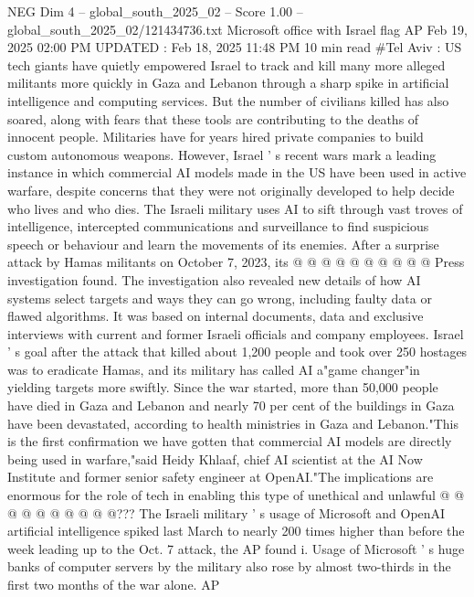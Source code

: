 \begin{textsample}{NEG Dim 4 – global\_south\_2025\_02 – Score 1.00 – global\_south\_2025\_02/121434736.txt}  \label{ex:f4_neg_434}
Microsoft office with Israel flag AP Feb 19, 2025 02:00 PM UPDATED : Feb 18, 2025 11:48 PM 10 min read \#Tel Aviv : US tech giants have quietly empowered Israel to track and kill many more alleged militants more quickly in Gaza and Lebanon through a sharp spike in artificial intelligence and computing services.
But the number of civilians killed has also soared, along with fears that these tools are contributing to the deaths of innocent people.
Militaries have for years hired private companies to build custom autonomous weapons.
However, Israel ' s recent wars mark a leading instance in which commercial AI models made in the US have been used in active warfare, despite concerns that they were not originally developed to help decide who lives and who dies.
The Israeli military uses AI to sift through vast troves of intelligence, intercepted communications and surveillance to find suspicious speech or behaviour and learn the movements of its enemies.
After a surprise attack by Hamas militants on October 7, 2023, its @ @ @ @ @ @ @ @ @ @ Press investigation found.
The investigation also revealed new details of how AI systems select targets and ways they can go wrong, including faulty data or flawed algorithms.
It was based on internal documents, data and exclusive interviews with current and former Israeli officials and company employees.
Israel ' s goal after the attack that killed about 1,200 people and took over 250 hostages was to eradicate Hamas, and its military has called AI a"game changer"in yielding targets more swiftly.
Since the war started, more than 50,000 people have died in Gaza and Lebanon and nearly 70 per cent of the buildings in Gaza have been devastated, according to health ministries in Gaza and Lebanon."This is the first confirmation we have gotten that commercial AI models are directly being used in warfare,"said Heidy Khlaaf, chief AI scientist at the AI Now Institute and former senior safety engineer at OpenAI."The implications are enormous for the role of tech in enabling this type of unethical and unlawful @ @ @ @ @ @ @ @ @ @???
The Israeli military ' s usage of Microsoft and OpenAI artificial intelligence spiked last March to nearly 200 times higher than before the week leading up to the Oct. 7 attack, the AP found i.
Usage of Microsoft ' s huge banks of computer servers by the military also rose by almost two-thirds in the first two months of the war alone.
AP

\end{textsample}
